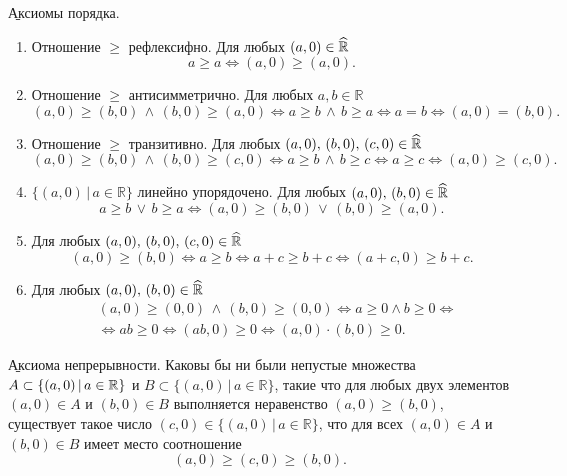 \b{Аксиомы порядка}.
\begin{enumerate}
	\item Отношение $\ge$ рефлексифно. Для любых $(a, 0)\in\widehat{\mathbb{R}}$
		$$ a\ge a\Leftrightarrow(a, 0)\ge(a, 0).$$
	\item Отношение $\ge$ антисимметрично. Для любых $a, b\in\mathbb{R}$
		$$(a, 0)\ge(b, 0)\,\wedge\,(b, 0)\ge(a, 0)\Leftrightarrow a\ge b\,\wedge\,b\ge a\Leftrightarrow a=b\Leftrightarrow (a, 0)=(b, 0).$$
	\item Отношение $\ge$ транзитивно. Для любых $(a, 0),\,(b, 0),\,(c, 0)\in\widehat{\mathbb{R}}$
		$$(a, 0)\ge(b, 0)\,\wedge\,(b, 0)\ge(c, 0)\Leftrightarrow a\ge b\,\wedge\,b\ge c\Leftrightarrow a\ge c\Leftrightarrow (a, 0)\ge(c, 0).$$
	\item $\{(a, 0)\,|\,a\in\mathbb{R}\}$ линейно упорядочено. Для любых $(a, 0),\,(b, 0)\in\widehat{\mathbb{R}}$
		$$ a\ge b\,\lor\,b\ge a\Leftrightarrow (a, 0)\ge (b, 0)\,\lor\, (b, 0)\ge(a, 0).$$
	\item Для любых $(a, 0),\,(b, 0),\,(c, 0)\in\widehat{\mathbb{R}}$
		$$(a, 0)\ge(b, 0)\Leftrightarrow a\ge b\Leftrightarrow a+c\ge b+c\Leftrightarrow (a+c, 0)\ge b+c.$$
	\item Для любых $(a, 0),\,(b, 0)\in\widehat{\mathbb{R}}$
		\begin{eqnarray*}
			& (a, 0)\ge(0, 0)\,\wedge\,(b,0)\ge(0,0)\Leftrightarrow a\ge 0\wedge b\ge 0\Leftrightarrow \\
			& \Leftrightarrow ab\ge 0\Leftrightarrow (ab, 0)\ge 0\Leftrightarrow(a, 0)\cdot(b, 0)\ge 0.
		\end{eqnarray*}
\end{enumerate}
\b{Аксиома непрерывности.} Каковы бы ни были непустые множества $A\hm\subset\{(a, 0)\,|\,a\in\mathbb{R}\}$ и $B\subset\{(a, 0)\,|\,a\in\mathbb{R}\}$, такие что для любых двух элементов $(a, 0)\in A$ и $(b, 0)\in B$ выполняется неравенство $(a, 0)\ge(b, 0)$, существует такое число $(c, 0)\in\{(a, 0)\,|\,a\in\mathbb{R}\}$, что для всех $(a, 0)\in A$ и $(b, 0)\in B$ имеет место соотношение
	$$(a, 0)\ge(c, 0)\ge(b, 0).$$
